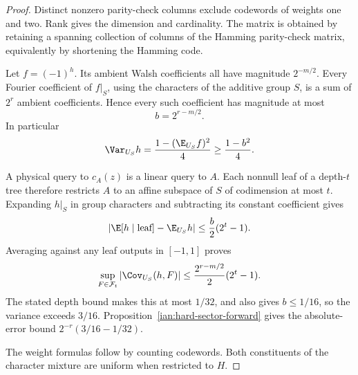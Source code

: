 \begin{proof}
Distinct nonzero parity-check columns exclude codewords of weights one and two. Rank gives the dimension and cardinality. The matrix is obtained by retaining a spanning collection of columns of the Hamming parity-check matrix, equivalently by shortening the Hamming code.

Let \(f=(-1)^h\). Its ambient Walsh coefficients all have magnitude \(2^{-m/2}\). Every Fourier coefficient of \(f|_S\), using the characters of the additive group \(S\), is a sum of \(2^r\) ambient coefficients. Hence every such coefficient has magnitude at most
\[
 b=2^{r-m/2}.
\]
In particular
\[
 \Var_{U_S}h
 =\frac{1-(\E_{U_S}f)^2}{4}
 \ge\frac{1-b^2}{4}.
\]

A physical query to \(c_A(z)\) is a linear query to \(A\). Each nonnull leaf of a depth-\(t\) tree therefore restricts \(A\) to an affine subspace of \(S\) of codimension at most \(t\). Expanding \(h|_S\) in group characters and subtracting its constant coefficient gives
\[
 \left|\E[h\mid\text{leaf}]-\E_{U_S}h\right|
 \le\frac b2(2^t-1).
\]
Averaging against any leaf outputs in \([-1,1]\) proves
\[
 \sup_{F\in\mathcal F_t}
 |\Cov_{U_S}(h,F)|
 \le \frac{2^{r-m/2}}2(2^t-1).
\]
The stated depth bound makes this at most \(1/32\), and also gives \(b\le1/16\), so the variance exceeds \(3/16\). Proposition~\ref{ian:hard-sector-forward} gives the absolute-error bound \(2^{-r}(3/16-1/32)\).

The weight formulas follow by counting codewords. Both constituents of the character mixture are uniform when restricted to \(H\).
\end{proof}


